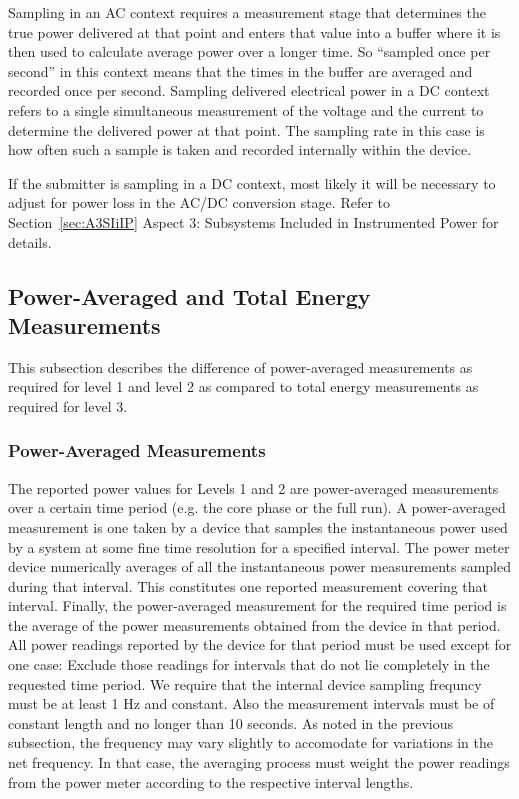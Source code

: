 \noindent
Sampling in an AC context requires a measurement stage that determines the true power delivered at that point and enters that value into a buffer where it is then used to calculate average power over a longer time.  So ``sampled once per second'' in this context means that the times in the buffer are averaged and recorded once per second.
Sampling delivered electrical power in a DC context refers to a single simultaneous measurement of the voltage and the current to determine the delivered power at that point.  The sampling rate in this case is how often such a sample is taken and recorded internally within the device.  
\wl

\noindent
If the submitter is sampling in a DC context, most likely it will be necessary to adjust for power loss in the AC/DC conversion stage. 
Refer to Section~\ref{sec:A3SIiIP} Aspect 3: Subsystems Included in Instrumented Power for details.

\subsection{Power-Averaged and Total Energy Measurements}
\label{sec:PAaTEM}

This subsection describes the difference of power-averaged measurements as required for level 1 and level 2 as compared to total energy measurements as required for level 3.

\subsubsection{Power-Averaged Measurements}

\noindent
The reported power values for Levels 1 and 2 are power-averaged measurements over a certain time period (e.g. the core phase or the full run).
A power-averaged measurement is one taken by a device that samples the instantaneous power used by a system at some fine time resolution for a specified interval.
The power meter device numerically averages of all the instantaneous power measurements sampled during that interval.
This constitutes one reported measurement covering that interval.
Finally, the power-averaged measurement for the required time period is the average of the power measurements obtained from the device in that period.
All power readings reported by the device for that period must be used except for one case:
Exclude those readings for intervals that do not lie completely in the requested time period.
We require that the internal device sampling frequncy must be at least 1 Hz and constant.
Also the measurement intervals must be of constant length and no longer than 10 seconds.
As noted in the previous subsection, the frequency may vary slightly to accomodate for variations in the net frequency.
In that case, the averaging process must weight the power readings from the power meter according to the respective interval lengths.
\wl

